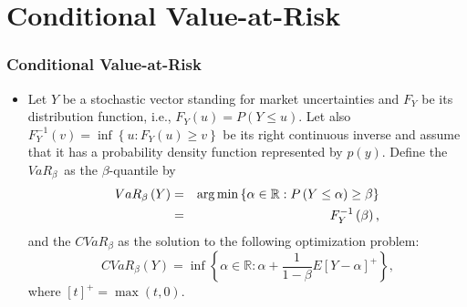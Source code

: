 \documentclass[pdf,10pt,xcolor=dvipsnames,hide notes]{beamer}
\begin{document}
\section{Conditional Value-at-Risk}
\begin{frame}[label=frame2b2]
	\frametitle{Conditional Value-at-Risk}
	\begin{itemize}
		\justifying
		
		\item 	Let $Y$ be a stochastic vector standing for market uncertainties and $F_{Y}$
		be its distribution function, i.e., $F_{Y}\left( u\right) =P\left( Y\leq
		u\right) $. Let also $F_{Y}^{-1}\left( v\right) =\inf \left\{ u:F_{Y}\left(
		u\right) \geq v\right\} $ be its right continuous inverse and assume that it
		has a probability density function represented by $p(y)$. Define the $VaR_{\beta
		}$\thinspace\ as the $\beta $-quantile by
		\begin{eqnarray}
		VaR_{\beta }\left( Y\right) &=& \arg \min \left\{ \alpha \in
		\mathbb{R}
		:P\left( Y\leq \alpha \right) \geq \beta \right\}  \label{one} \\
		&=&F_{Y}^{-1}\left( \beta \right) \text{,}  \notag
		\end{eqnarray}%
		and the $CVaR_{\beta }$ as the solution to the following optimization
		problem:
		\begin{equation}
		CVaR_{\beta }\left( Y\right) =\inf \left\{ \alpha \in
		\mathbb{R}
		:\alpha +\frac{1}{1-\beta }E\left[ Y-\alpha \right] ^{+}\right\} \text{,}
		\label{two}
		\end{equation}%
		where $\left[ t\right] ^{+}=\max \left( t,0\right) $.
		
	\end{itemize}
	
\end{frame}
\end{document}
